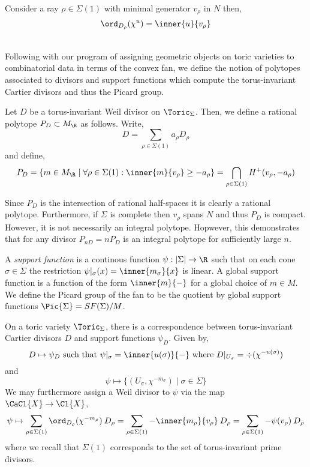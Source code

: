 \documentclass[12pt]{article}
\begin{document}
\begin{lemma}
Consider a ray $\rho \in \Sigma(1)$ with minimal generator $v_\rho$ in $N$ then,
\[ \ord_{D_\rho}(\chi^u) = \inner{u}{v_\rho} \]
\end{lemma}
\noindent\\
Following with our program of assigning geometric objects on toric varieties to combinatorial data in terms of the convex fan, we define the notion of polytopes associated to divisors and support functions which compute the torus-invariant Cartier divisors and thus the Picard group. 

\begin{defn}
Let $D$ be a torus-invariant Weil divisor on $\Toric_\Sigma$. Then, we define a rational polytope $P_D \subset M_\R$ as follows. Write,
\[ D = \sum_{\rho \in \Sigma(1)} a_\rho D_\rho \]
and define,
\[ P_D = \{ m \in M_\R \mid \forall \rho \in \Sigma(1) : \inner{m}{v_\rho} \ge - a_\rho \} = \bigcap_{\rho \in \Sigma(1)} H^+(v_\rho, -a_\rho) \]
\end{defn}

\begin{rmk}
Since $P_D$ is the intersection of rational half-spaces it is clearly a rational polytope. Furthermore, if $\Sigma$ is complete then $v_\rho$ spans $N$ and thus $P_D$ is compact. However, it is not necessarily an integral polytope. Hopwever, this demonstrates that for any divisor $P_{nD} = n P_D$ is an integral polytope for sufficiently large $n$. 
\end{rmk}

\begin{definition}
A \textit{support function} is a continous function $\psi : |\Sigma| \to \R$ such that on each cone $\sigma \in \Sigma$ the restriction $\psi |_\sigma(x) = \inner{m_\sigma}{x}$ is linear. A global support function is a function of the form $\inner{m}{-}$ for  a global choice of $m \in M$. We define the Picard group of the fan to be the quotient by global support functions $\Pic{\Sigma} = SF(\Sigma) / M$. 
\end{definition}

\begin{proposition}
On a toric variety $\Toric_\Sigma$, there is a correspondence between torus-invariant Cartier divisors $D$ and support functions $\psi_D$. Given by,
\[ D \mapsto \psi_D \text{ such that } \psi|_\sigma = \inner{u(\sigma)}{-} \text{ where } D |_{U_\sigma} =  \div{(\chi^{-u(\sigma)})} \]
and
\[ \psi \mapsto \{ (U_\sigma, \chi^{-m_\sigma}) \mid \sigma \in \Sigma \} \] 
We may furthermore assign a Weil divisor to $\psi$ via the map $\CaCl{X} \to \Cl{X}$,
\[ \psi \mapsto \sum_{\rho \in \Sigma(1)} \ord_{D_\rho}(\chi^{-m_\rho}) \: D_\rho = \sum_{\rho \in \Sigma(1)} -\inner{m_\rho}{v_\rho} \: D_\rho = \sum_{\rho \in \Sigma(1)} -\psi(v_\rho) \: D_\rho \] 
where we recall that $\Sigma(1)$ corresponds to the set of torus-invariant prime divisors.
\end{proposition}
\end{document}
